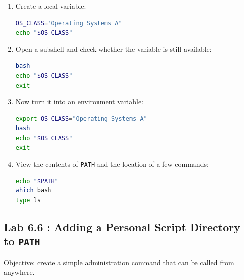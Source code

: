 \begin{enumerate}
  \item Create a local variable:
\begin{lstlisting}[language=bash, caption={Creating a local shell variable}]
OS_CLASS="Operating Systems A"
echo "$OS_CLASS"
\end{lstlisting}

  \item Open a subshell and check whether the variable is still available:
\begin{lstlisting}[language=bash, caption={Testing a local variable in a subshell}]
bash
echo "$OS_CLASS"
exit
\end{lstlisting}

  \item Now turn it into an environment variable:
\begin{lstlisting}[language=bash, caption={Creating an environment variable}]
export OS_CLASS="Operating Systems A"
bash
echo "$OS_CLASS"
exit
\end{lstlisting}

  \item View the contents of \texttt{PATH} and the location of a few commands:
\begin{lstlisting}[language=bash, caption={Viewing PATH and command locations}]
echo "$PATH"
which bash
type ls
\end{lstlisting}
\end{enumerate}

\subsection*{Lab 6.6 : Adding a Personal Script Directory to \texttt{PATH}}

Objective: create a simple administration command that can be called from
anywhere.

